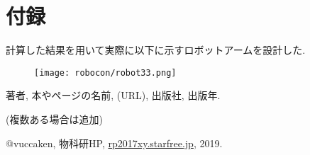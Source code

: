 \documentclass[10pt,b5paper,papersize,dvipdfmx]{jsbook}
\begin{document}
\section{付録}
計算した結果を用いて実際に以下に示すロボットアームを設計した. 
\begin{figure}[H]
  \centering
  \texttt{[image: robocon/robot33.png]}
\end{figure}

\begin{thebibliography}{99}
  \item 著者, 本やページの名前, (URL), 出版社, 出版年.
  \item (複数ある場合は追加)
  \item @vuccaken, 物科研HP, \url{rp2017xy.starfree.jp}, 2019.
\end{thebibliography}
\end{document}
